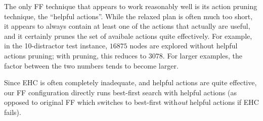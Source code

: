 
The only FF technique that appears to work reasonably well is its
action pruning technique, the ``helpful actions''. While the relaxed
plan is often much too short, it appears to always contain at least
one of the actions that actually are useful, and it certainly prunes
the set of avaibale actions quite effectively. For example, in the
10-distractor test instance, $16875$ nodes are explored without
helpful actions pruning; with pruning, this reduces to $3078$. For
larger examples, the factor between the two numbers tends to become
larger. 



Since EHC is often completely inadequate, and helpful actions are
quite effective, our FF configuration directly runs best-first search
with helpful actions (as opposed to original FF which switches to
best-first with{\em out} helpful actions if EHC fails).










